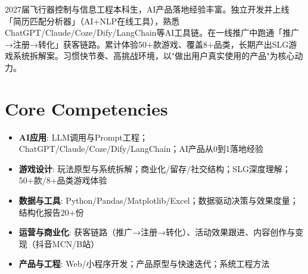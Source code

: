 \documentclass[11pt,a4paper,sans]{moderncv}
\begin{document}
\makecvtitle


\vspace{6pt}
\small{2027届飞行器控制与信息工程本科生，AI产品落地经验丰富。独立开发并上线「简历匹配分析器」（AI+NLP在线工具），熟悉ChatGPT/Claude/Coze/Dify/LangChain等AI工具链。在一线推广中跑通「推广→注册→转化」获客链路。累计体验50+款游戏、覆盖8+品类，长期产出SLG游戏系统拆解案。习惯快节奏、高挑战环境，以"做出用户真实使用的产品"为核心动力。}


\section{Core Competencies}
\vspace{1pt}
\begin{itemize}

\item \textbf{AI应用}: LLM调用与Prompt工程；ChatGPT/Claude/Coze/Dify/LangChain；AI产品从0到1落地经验

\item \textbf{游戏设计}: 玩法原型与系统拆解；商业化/留存/社交结构；SLG深度理解；50+款/8+品类游戏体验

\item \textbf{数据与工具}: Python/Pandas/Matplotlib/Excel；数据驱动决策与效果度量；结构化报告20+份

\item \textbf{运营与商业化}: 获客链路（推广→注册→转化）、活动效果跟进、内容创作与变现（抖音MCN/B站）

\item \textbf{产品与工程}: Web/小程序开发；产品原型与快速迭代；系统工程方法

\end{itemize}

\end{document}
